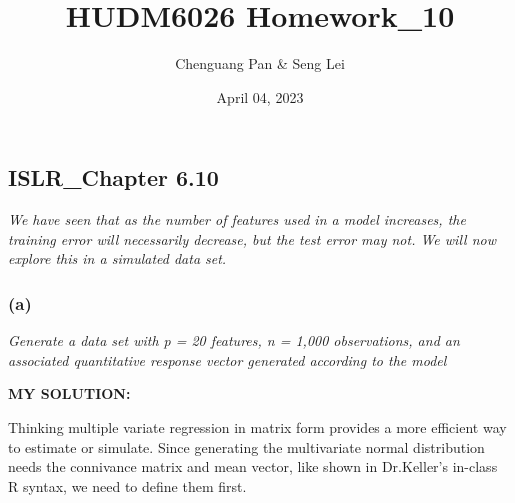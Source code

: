 \documentclass[
]{article}
\title{HUDM6026 Homework\_10}
\author{Chenguang Pan \& Seng Lei}
\date{April 04, 2023}
\begin{document}
\maketitle

\hypertarget{islr_chapter-6.10}{%
\subsection{ISLR\_Chapter 6.10}\label{islr_chapter-6.10}}

\emph{We have seen that as the number of features used in a model
increases, the training error will necessarily decrease, but the test
error may not. We will now explore this in a simulated data set.}

\hypertarget{a}{%
\subsubsection{(a)}\label{a}}

\emph{Generate a data set with p = 20 features, n = 1,000 observations,
and an associated quantitative response vector generated according to
the model}

\textbf{MY SOLUTION:}

Thinking multiple variate regression in matrix form provides a more
efficient way to estimate or simulate. Since generating the multivariate
normal distribution needs the connivance matrix and mean vector, like
shown in Dr.Keller's in-class R syntax, we need to define them first.
\end{document}
